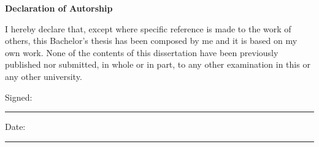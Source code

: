 \vspace*{4cm}
\Huge
\textbf{Declaration of Autorship} \label{sec:acknowledgments}
\normalsize

\vspace{1cm}

I hereby declare that, except where specific reference is made to the work of others, this Bachelor's thesis has been composed by me and it is based on my own work. None of the contents of this dissertation have been previously published nor submitted, in whole or in part, to any other examination in this or any other university.

\vspace{2cm}

Signed:

\rule[0.3cm]{.6\textwidth}{0.2pt}

\vspace{2cm}

Date:

\rule[0.3cm]{.6\textwidth}{0.2pt}


\vspace*{\fill}
